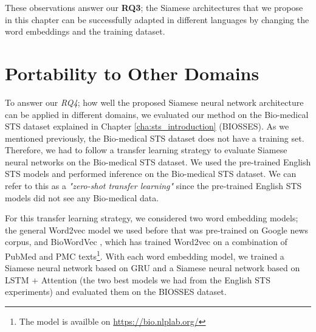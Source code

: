 These observations answer our \textbf{RQ3}; the Siamese architectures that we propose in this chapter can be successfully adapted in different languages by changing the word embeddings and the training dataset.

\section{Portability to Other Domains}
\label{sec:siamese_domains}
To answer our \textit{RQ4}; how well the proposed Siamese neural network architecture can be applied in different domains, we evaluated our method on the Bio-medical STS dataset explained in Chapter \ref{cha:sts_introduction} (BIOSSES). As we mentioned previously, the Bio-medical STS dataset does not have a training set. Therefore, we had to follow a transfer learning strategy to evaluate Siamese neural networks on the Bio-medical STS dataset. We used the pre-trained English STS models and performed inference on the Bio-medical STS dataset. We can refer to this as a \textit{"zero-shot transfer learning"} since the pre-trained English STS models did not see any Bio-medical data.

For this transfer learning strategy, we considered two word embedding models; the general Word2vec model we used before \cite{DBLP:journals/corr/abs-1301-3781} that was pre-trained on Google news corpus, and BioWordVec \cite{Zhang2019}, which has trained Word2vec on a combination of PubMed and PMC texts\footnote{The model is availble on \url{https://bio.nlplab.org/}}. With each word embedding model, we trained a Siamese neural network based on GRU and a Siamese neural network based on LSTM + Attention (the two best models we had from the English STS experiments) and evaluated them on the BIOSSES dataset.


